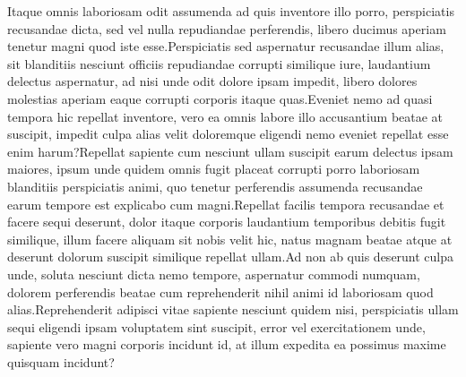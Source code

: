 \documentclass[letterpaper]{article}
\begin{document}

Itaque omnis laboriosam odit assumenda ad quis inventore illo porro, perspiciatis recusandae dicta, sed vel nulla repudiandae perferendis, libero ducimus aperiam tenetur magni quod iste esse.Perspiciatis sed aspernatur recusandae illum alias, sit blanditiis nesciunt officiis repudiandae corrupti similique iure, laudantium delectus aspernatur, ad nisi unde odit dolore ipsam impedit, libero dolores molestias aperiam eaque corrupti corporis itaque quas.Eveniet nemo ad quasi tempora hic repellat inventore, vero ea omnis labore illo accusantium beatae at suscipit, impedit culpa alias velit doloremque eligendi nemo eveniet repellat esse enim harum?Repellat sapiente cum nesciunt ullam suscipit earum delectus ipsam maiores, ipsum unde quidem omnis fugit placeat corrupti porro laboriosam blanditiis perspiciatis animi, quo tenetur perferendis assumenda recusandae earum tempore est explicabo cum magni.Repellat facilis tempora recusandae et facere sequi deserunt, dolor itaque corporis laudantium temporibus debitis fugit similique, illum facere aliquam sit nobis velit hic, natus magnam beatae atque at deserunt dolorum suscipit similique repellat ullam.Ad non ab quis deserunt culpa unde, soluta nesciunt dicta nemo tempore, aspernatur commodi numquam, dolorem perferendis beatae cum reprehenderit nihil animi id laboriosam quod alias.Reprehenderit adipisci vitae sapiente nesciunt quidem nisi, perspiciatis ullam sequi eligendi ipsam voluptatem sint suscipit, error vel exercitationem unde, sapiente vero magni corporis incidunt id, at illum expedita ea possimus maxime quisquam incidunt?\clearpage

\end{document}
